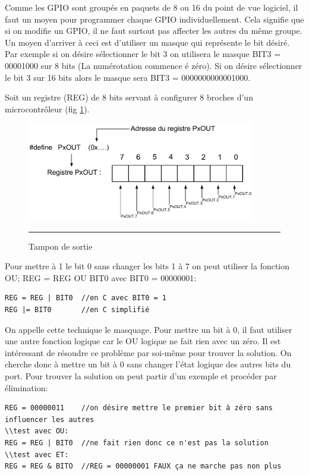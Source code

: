 Comme les GPIO sont groupés en paquets de 8 ou 16 du point de vue logiciel, il faut un moyen pour programmer chaque GPIO individuellement. Cela signifie que si on modifie un GPIO, il ne faut surtout pas affecter les autres du même groupe. Un moyen d'arriver à ceci est d'utiliser un masque qui représente le bit désiré. Par exemple si on désire sélectionner le bit 3 on utilisera le masque BIT3 = 00001000 sur 8 bits (La numérotation commence é zéro). Si on désire sélectionner le bit 3 sur 16 bits alors le masque sera BIT3 = 0000000000001000.

Soit un registre (REG) de 8 bits servant à configurer 8 broches d'un microcontrôleur (fig \ref{fig:pxout}). 

\begin{figure}[htb]
  \centering
  \includegraphics[angle=0, width=10cm]{./Figures/gpio/PxOUT.pdf}
  \rule{35em}{0.5pt}
  \caption[buff out]{Tampon de sortie}
  \label{fig:pxout}
\end{figure}

Pour mettre à 1 le bit 0 sans changer les bits 1 à 7 on peut utiliser la fonction OU; REG = REG OU BIT0 avec BIT0 = 00000001:

\lstset{style=customc}
\begin{lstlisting}
REG = REG | BIT0  //en C avec BIT0 = 1
REG |= BIT0		  //en C simplifié
\end{lstlisting}

On appelle cette technique le masquage. Pour mettre un bit à 0, il faut utiliser une autre fonction logique car le OU logique ne fait rien avec un zéro. Il est intéressant de résoudre ce problème par soi-même pour trouver la solution. On cherche donc à mettre un bit à 0 sans changer l'état logique des autres bits du port. Pour trouver la solution on peut partir d'un exemple et procéder par élimination:

\lstset{style=customc}
\begin{lstlisting}
REG = 00000011    //on désire mettre le premier bit à zéro sans influencer les autres
\\test avec OU:
REG = REG | BIT0  //ne fait rien donc ce n'est pas la solution
\\test avec ET:
REG = REG & BITO  //REG = 00000001 FAUX ça ne marche pas non plus
\end{lstlisting}

